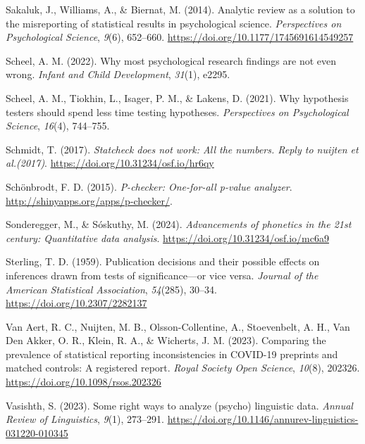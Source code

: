 \documentclass[
  doc,
  longtable,
  nolmodern,
  notxfonts,
  notimes,
  colorlinks=true,linkcolor=blue,citecolor=blue,urlcolor=blue]{apa7}
\newlength{\cslhangindent}
\newenvironment{CSLReferences}[2] %
 {\begin{list}{}{%
  \setlength{\itemindent}{0pt}
  \setlength{\leftmargin}{0pt}
  \setlength{\parsep}{0pt}
  \ifodd #1
   \setlength{\leftmargin}{\cslhangindent}
   \setlength{\itemindent}{-1\cslhangindent}
  \fi
  \setlength{\itemsep}{#2\baselineskip}}}
 {\end{list}}
\begin{document}
\begin{CSLReferences}{1}{0}
Sakaluk, J., Williams, A., \& Biernat, M. (2014). Analytic review as a
solution to the misreporting of statistical results in psychological
science. \emph{Perspectives on Psychological Science}, \emph{9}(6),
652--660. \url{https://doi.org/10.1177/1745691614549257}

Scheel, A. M. (2022). Why most psychological research findings are not
even wrong. \emph{Infant and Child Development}, \emph{31}(1), e2295.

Scheel, A. M., Tiokhin, L., Isager, P. M., \& Lakens, D. (2021). Why
hypothesis testers should spend less time testing hypotheses.
\emph{Perspectives on Psychological Science}, \emph{16}(4), 744--755.

Schmidt, T. (2017). \emph{Statcheck does not work: All the numbers.
Reply to nuijten et al.(2017)}.
\url{https://doi.org/10.31234/osf.io/hr6qy}

Schönbrodt, F. D. (2015). \emph{P-checker: One-for-all p-value
analyzer}. \url{http://shinyapps.org/apps/p-checker/}.

Sonderegger, M., \& Sóskuthy, M. (2024). \emph{Advancements of phonetics
in the 21st century: Quantitative data analysis}.
\url{https://doi.org/10.31234/osf.io/mc6a9}

Sterling, T. D. (1959). Publication decisions and their possible effects
on inferences drawn from tests of significance---or vice versa.
\emph{Journal of the American Statistical Association}, \emph{54}(285),
30--34. \url{https://doi.org/10.2307/2282137}

Van Aert, R. C., Nuijten, M. B., Olsson-Collentine, A., Stoevenbelt, A.
H., Van Den Akker, O. R., Klein, R. A., \& Wicherts, J. M. (2023).
Comparing the prevalence of statistical reporting inconsistencies in
COVID-19 preprints and matched controls: A registered report.
\emph{Royal Society Open Science}, \emph{10}(8), 202326.
\url{https://doi.org/10.1098/rsos.202326}

Vasishth, S. (2023). Some right ways to analyze (psycho) linguistic
data. \emph{Annual Review of Linguistics}, \emph{9}(1), 273--291.
\url{https://doi.org/10.1146/annurev-linguistics-031220-010345}


\end{CSLReferences}
\end{document}
